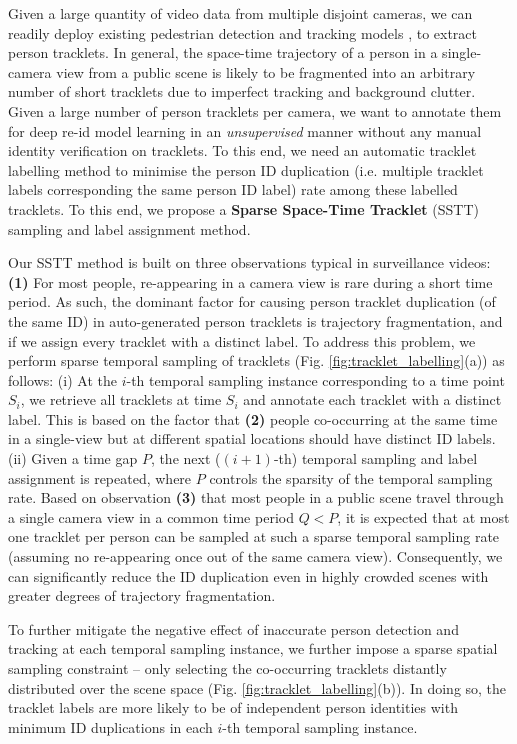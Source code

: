 \documentclass[runningheads]{llncs}
\begin{document}
Given a large quantity of video data from multiple disjoint cameras,
we can readily deploy existing
pedestrian detection and tracking models
\cite{zheng2017unlabeled,ristani2016performance,leal2015motchallenge,zhang2016far}, 
to extract person tracklets. 
In general, the space-time trajectory of a person in a single-camera
view from a public scene is likely to be fragmented into an arbitrary number of short tracklets
due to imperfect tracking and background clutter.
Given a large number of person tracklets per camera, we want to annotate them for deep re-id model learning
in an {\em unsupervised} manner
without any manual identity verification on tracklets.
To this end, we need an automatic tracklet labelling method
to minimise the person ID duplication (i.e. multiple tracklet labels corresponding the
same person ID label) rate among these labelled tracklets.
To this end, 
we propose a {\bf Sparse Space-Time Tracklet} (SSTT) sampling and
label assignment method.

Our SSTT method is built on three observations 
typical in surveillance videos:
{\bf(1)} For most people, 
re-appearing in a camera view is rare during a short time period.
As such, the dominant factor for causing person tracklet duplication
(of the same ID) in
auto-generated person tracklets is trajectory fragmentation, and if we assign every tracklet with a distinct label.
To address this problem, we perform sparse temporal sampling of tracklets
(Fig. \ref{fig:tracklet_labelling}(a)) as follows:
(i) At the $i$-th temporal sampling instance corresponding to a time point $S_i$,
we retrieve all tracklets at time $S_i$
and annotate each tracklet with a distinct label. 
This is based on the factor that
{\bf(2)} people co-occurring at the same time in a single-view but 
at different spatial locations should have distinct ID labels.
(ii) Given a time gap $P$, the next ($(i+1)$-th) temporal sampling and
label assignment is repeated, where $P$ controls the sparsity of the temporal sampling rate.
Based on observation {\bf(3)} that
most people in a public scene travel through a single camera view
in a common time period $Q < P$, 
it is expected that at most one tracklet per person can
be sampled at such a sparse temporal sampling rate (assuming no
re-appearing once out of the same camera view).
Consequently, we can significantly reduce the
ID duplication even in highly crowded scenes with greater degrees of trajectory fragmentation.


To further mitigate the negative effect of inaccurate person detection
and tracking at each temporal sampling instance, we 
further impose a sparse spatial sampling constraint
-- only selecting the co-occurring
tracklets distantly distributed over the scene space (Fig. \ref{fig:tracklet_labelling}(b)).
In doing so, 
the tracklet labels are more likely to be of independent person identities
with minimum ID duplications in each $i$-th temporal sampling instance. 
\end{document}
